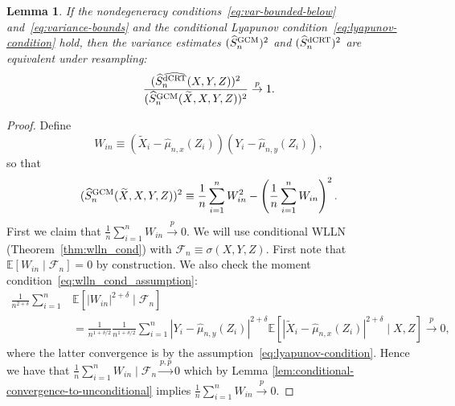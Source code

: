 \documentclass[12pt]{article}
\newtheorem{lemma}{Lemma}
\theoremstyle{definition}
\theoremstyle{remark}
\newcommand{\E}{\mathbb E}								%
\newcommand{\convp}{\overset p \rightarrow}             %
\newcommand{\srx}{X}									%
\newcommand{\srz}{Z}									%
\newcommand{\srxk}{\widetilde X}						%
\newcommand{\sry}{Y}									%
\newcommand{\dCRT}{\textnormal{dCRT}} 					%
\newcommand{\GCM}{\textnormal{GCM}}						%
\newcommand{\dCRThat}{\widehat{\textnormal{dCRT}}}		%
\newcommand{\convpp}{\overset {p,p} \longrightarrow}    %
\begin{document}
\begin{lemma} \label{lem:var-ratio-ndcrt-dcrt}
If the nondegeneracy conditions~\eqref{eq:var-bounded-below} and~\eqref{eq:variance-bounds} and the conditional Lyapunov condition~\eqref{eq:lyapunov-condition} hold, then the variance estimates $(\widehat S_n^{\GCM})^2$ and $(\widehat S_n^{\dCRT})^2$ are equivalent under resampling:
\begin{equation}
\frac{(\widehat S_n^{\dCRThat}(\srx, \sry, \srz))^2}{(\widehat S_{n}^{\GCM}(\srxk, \srx, \sry, \srz))^2} \convp 1.
\label{eq:var-ratio-ndcrt-dcrt}
\end{equation}
\end{lemma}
\begin{proof}
Define 
\begin{equation*}
W_{in}  \equiv  (\srxk_i - \widehat \mu_{n,x}(\srz_i))(\sry_i - \widehat \mu_{n,y}(\srz_i)),
\end{equation*}
so that 
\begin{equation*}
(\widehat S_{n}^{\GCM}(\srxk, \srx, \sry, \srz))^2 \equiv \frac{1}{n} \sum_{i=1}^n W_{in}^2 - \left(\frac{1}{n} \sum_{i=1}^n W_{in}\right)^2.
\end{equation*} 
First we claim that $\frac{1}{n}\sum_{i = 1}^n W_{in} \convp 0$.  We will use conditional WLLN (Theorem~\ref{thm:wlln_cond}) with $\mathcal{F}_n \equiv \sigma(\srx,\sry,\srz)$. First note that $\E[W_{in} \mid \mathcal{F}_n] = 0$ by construction. We also check the moment condition~\eqref{eq:wlln_cond_assumption}:
\begin{align*}
	\frac{1}{n^{2+\delta}} \sum_{i = 1}^n &\E[|W_{in}|^{2+\delta} \mid \mathcal{F}_n] \\&= \frac{1}{n^{1+\delta/2}}\frac{1}{n^{1+\delta/2}} \sum_{i=1}^n |\sry_i-\widehat\mu_{n,y}(\srz_i)|^{2+\delta}\E\left[|\srxk_i-\widehat\mu_{n,x}(\srz_i)|^{2+\delta}\mid \srx,\srz\right] \convp 0,
\end{align*} 
where the latter convergence is by the assumption~\eqref{eq:lyapunov-condition}.
Hence we have that $\frac{1}{n} \sum_{i = 1}^n W_{in}  \mid \mathcal F_n \convpp 0$ which by Lemma \ref{lem:conditional-convergence-to-unconditional} implies $\frac{1}{n} \sum_{i=1}^n W_{in} \convp 0$.


\end{proof}
\end{document}
